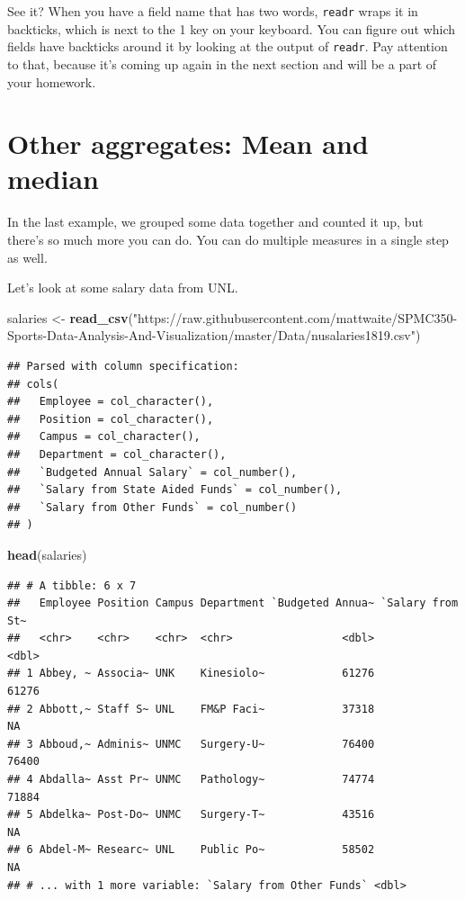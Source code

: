 \documentclass[]{book}
\newenvironment{Shaded}{\begin{snugshade}}{\end{snugshade}}
\newcommand{\KeywordTok}[1]{\textcolor[rgb]{0.13,0.29,0.53}{\textbf{#1}}}
\newcommand{\StringTok}[1]{\textcolor[rgb]{0.31,0.60,0.02}{#1}}
\newcommand{\NormalTok}[1]{#1}
\begin{document}
See it? When you have a field name that has two words, \texttt{readr}
wraps it in backticks, which is next to the 1 key on your keyboard. You
can figure out which fields have backticks around it by looking at the
output of \texttt{readr}. Pay attention to that, because it's coming up
again in the next section and will be a part of your homework.

\section{Other aggregates: Mean and
median}\label{other-aggregates-mean-and-median}

In the last example, we grouped some data together and counted it up,
but there's so much more you can do. You can do multiple measures in a
single step as well.

Let's look at some salary data from UNL.

\begin{Shaded}
\begin{Highlighting}[]
\NormalTok{salaries <-}\StringTok{ }\KeywordTok{read_csv}\NormalTok{(}\StringTok{"https://raw.githubusercontent.com/mattwaite/SPMC350-Sports-Data-Analysis-And-Visualization/master/Data/nusalaries1819.csv"}\NormalTok{)}
\end{Highlighting}
\end{Shaded}

\begin{verbatim}
## Parsed with column specification:
## cols(
##   Employee = col_character(),
##   Position = col_character(),
##   Campus = col_character(),
##   Department = col_character(),
##   `Budgeted Annual Salary` = col_number(),
##   `Salary from State Aided Funds` = col_number(),
##   `Salary from Other Funds` = col_number()
## )
\end{verbatim}

\begin{Shaded}
\begin{Highlighting}[]
\KeywordTok{head}\NormalTok{(salaries)}
\end{Highlighting}
\end{Shaded}

\begin{verbatim}
## # A tibble: 6 x 7
##   Employee Position Campus Department `Budgeted Annua~ `Salary from St~
##   <chr>    <chr>    <chr>  <chr>                 <dbl>            <dbl>
## 1 Abbey, ~ Associa~ UNK    Kinesiolo~            61276            61276
## 2 Abbott,~ Staff S~ UNL    FM&P Faci~            37318               NA
## 3 Abboud,~ Adminis~ UNMC   Surgery-U~            76400            76400
## 4 Abdalla~ Asst Pr~ UNMC   Pathology~            74774            71884
## 5 Abdelka~ Post-Do~ UNMC   Surgery-T~            43516               NA
## 6 Abdel-M~ Researc~ UNL    Public Po~            58502               NA
## # ... with 1 more variable: `Salary from Other Funds` <dbl>
\end{verbatim}
\end{document}
